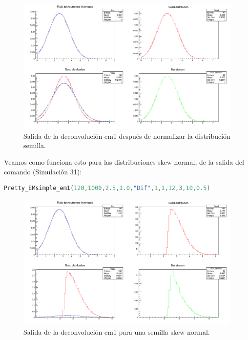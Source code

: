 \documentclass[11pt,letterpaper]{article}
\begin{document}
\begin{figure}[H]
    \includegraphics[width=1.\textwidth]{img/em1_despues_de_normalizar.png}
    \centering
     \cprotect\caption{Salida de la deconvolución em1 después de normalizar la distribución semilla.} 
\label{plot_em1_despues_de_normalizar}
\end{figure}

Veamos como funciona esto para las distribuciones skew normal, de la salida del comando (Simulación 31):

\begin{lstlisting}[language=c++]
Pretty_EMsimple_em1(120,1000,2.5,1.0,"Dif",1,1,12,3,10,0.5)
\end{lstlisting}

\begin{figure}[H]
    \includegraphics[width=1.\textwidth]{img/em1_semilla_skew_normal_c1.png}
    \centering
     \cprotect\caption{Salida de la deconvolución em1 para una semilla skew normal.} 
\label{plot_em1_semilla_skew_normal_c1}
\end{figure}
\end{document}
